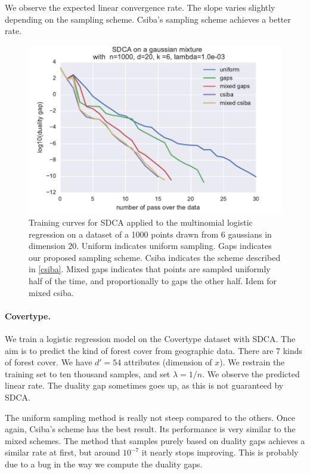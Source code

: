 \documentclass{article}
\DeclareMathOperator{\1}{\mathbb{1}}
\begin{document}
We observe the expected linear convergence rate.
The slope varies slightly depending on the sampling scheme.
Csiba's sampling scheme achieves a better rate.


\begin{figure}[ht]
	\center
	\includegraphics[width=.8\textwidth]{images/20170914_061831_gaussians_perf.pdf}
	\caption{Training curves for SDCA applied to the multinomial logistic regression on a dataset of a 1000 points drawn from 6 gaussians in dimension 20. Uniform indicates uniform sampling. Gaps indicates our proposed sampling scheme. Csiba indicates the scheme described in \ref{csiba}. Mixed gaps indicates that points are sampled uniformly half of the time, and proportionally to gaps the other half. Idem for mixed csiba.}
	\label{training gaussians}
\end{figure}


\paragraph{Covertype.}
We train a logistic regression model on the Covertype dataset \cite{blackard_comparative_1999} with SDCA.
The aim is to predict the kind of forest cover from geographic data. 
There are 7 kinds of forest cover.
We have $d'=54$ attributes (dimension of $x$).
We restrain the training set to ten thousand samples, and set $\lambda = 1/n$.
We observe the predicted linear rate.
The duality gap sometimes goes up, as this is not guaranteed by SDCA.

The uniform sampling method is really not steep compared to the others. 
Once again, Csiba's scheme has the best result.
Its performance is very similar to the mixed schemes.
The method that samples purely based on duality gaps achieves a similar rate at first, but around $10^{-7}$ it nearly stops improving.
This is probably due to a bug in the way we compute the duality gaps.
\end{document}

